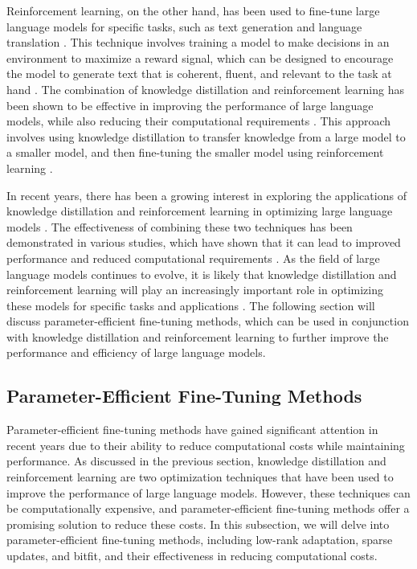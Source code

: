 \documentclass[11pt]{article}
\begin{document}
Reinforcement learning, on the other hand, has been used to fine-tune large language models for specific tasks, such as text generation and language translation \cite{ref111}. This technique involves training a model to make decisions in an environment to maximize a reward signal, which can be designed to encourage the model to generate text that is coherent, fluent, and relevant to the task at hand \cite{ref112}. The combination of knowledge distillation and reinforcement learning has been shown to be effective in improving the performance of large language models, while also reducing their computational requirements \cite{ref113}. This approach involves using knowledge distillation to transfer knowledge from a large model to a smaller model, and then fine-tuning the smaller model using reinforcement learning \cite{ref114}.

In recent years, there has been a growing interest in exploring the applications of knowledge distillation and reinforcement learning in optimizing large language models \cite{ref115}. The effectiveness of combining these two techniques has been demonstrated in various studies, which have shown that it can lead to improved performance and reduced computational requirements \cite{ref116}. As the field of large language models continues to evolve, it is likely that knowledge distillation and reinforcement learning will play an increasingly important role in optimizing these models for specific tasks and applications \cite{ref117}. The following section will discuss parameter-efficient fine-tuning methods, which can be used in conjunction with knowledge distillation and reinforcement learning to further improve the performance and efficiency of large language models.

\subsection{Parameter-Efficient Fine-Tuning Methods}

Parameter-efficient fine-tuning methods have gained significant attention in recent years due to their ability to reduce computational costs while maintaining performance. As discussed in the previous section, knowledge distillation and reinforcement learning are two optimization techniques that have been used to improve the performance of large language models. However, these techniques can be computationally expensive, and parameter-efficient fine-tuning methods offer a promising solution to reduce these costs. In this subsection, we will delve into parameter-efficient fine-tuning methods, including low-rank adaptation, sparse updates, and bitfit, and their effectiveness in reducing computational costs.
\end{document}
